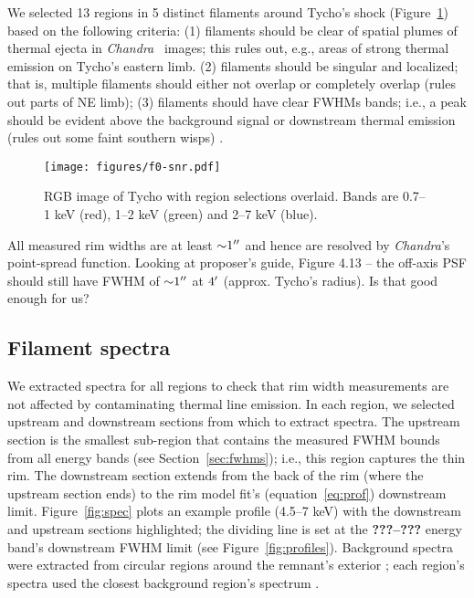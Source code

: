 \documentclass[iop, apj, numberedappendix, twocolappendix]{emulateapj}
\newcommand*{\abt}{\mathord{\sim}} %
\newcommand*{\Chandra}{\textit{Chandra}\ }
\begin{document}
We selected 13 regions in 5 distinct filaments around Tycho's shock
(Figure~\ref{fig:snr}) based on the following criteria:
(1) filaments should be clear of spatial plumes of thermal ejecta in \Chandra
images; this rules out, e.g., areas of strong thermal emission on Tycho's eastern limb.
(2) filaments should be singular and localized; that is, multiple filaments
should either not overlap or completely overlap (rules out parts of NE limb);
(3) filaments should have clear FWHMs bands; i.e., a peak should be evident
above the background signal or downstream thermal emission (rules out some
faint southern wisps) .

\begin{figure}
    \centering
    \texttt{[image: figures/f0-snr.pdf]}
    \caption{RGB image of Tycho with region selections overlaid.  Bands are
    0.7--1 keV (red), 1--2 keV (green) and 2--7 keV (blue).
    }
    \label{fig:snr}
\end{figure}

All measured rim widths are at least $\abt 1\arcsec$ and hence are resolved by
\textit{Chandra}'s point-spread function.
Looking at proposer's guide, Figure 4.13 -- the off-axis PSF should
still have FWHM of $\abt 1\arcsec$ at $4\mbox{$^\prime$}$ (approx. Tycho's radius).
Is that good enough for us?

\subsection{Filament spectra}
\label{sec:spec}

We extracted spectra for all regions to check that rim width measurements are
not affected by contaminating thermal line emission.  In each region, we
selected upstream and downstream sections  from which to extract spectra.
The upstream section is the smallest sub-region that contains the measured FWHM
bounds from all energy bands (see Section~\ref{sec:fwhms}); i.e., this region
captures the thin rim.
The downstream section extends from the back of the rim (where the upstream
section ends) to the rim model fit's
(equation~\eqref{eq:prof}) downstream limit.
Figure~\ref{fig:spec} plots an example profile (4.5--7 keV) with the
downstream and upstream sections highlighted; the dividing line is set at the
\textbf{???--???} energy band's downstream FWHM limit (see Figure~\ref{fig:profiles}).
Background spectra were extracted from circular regions around the remnant's
exterior ; each region's spectra used the
closest background region's spectrum .
\end{document}
